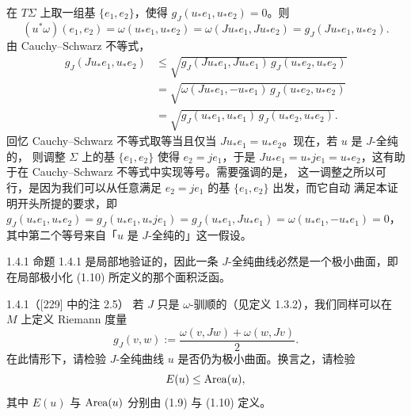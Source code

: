 \begin{wproof}
在 $T\Sigma$ 上取一组基 $\{e_1,e_2\}$，使得 $g_J(u_*e_1,u_*e_2)=0$。则
\[
  (u^*\omega)(e_1,e_2)=\omega(u_*e_1,u_*e_2)=\omega(Ju_*e_1,Ju_*e_2)=g_J(Ju_*e_1,u_*e_2).
\]
由 Cauchy--Schwarz 不等式，
\[
  \begin{aligned}
    g_J(Ju_*e_1,u_*e_2)
    &\le\sqrt{g_J(Ju_*e_1,Ju_*e_1)\,g_J(u_*e_2,u_*e_2)}\\
    &=\sqrt{\omega(Ju_*e_1,-u_*e_1)\,g_J(u_*e_2,u_*e_2)}\\
    &=\sqrt{g_J(u_*e_1,u_*e_1)\,g_J(u_*e_2,u_*e_2)} .
  \end{aligned}
\]
回忆 Cauchy--Schwarz 不等式取等当且仅当 $Ju_*e_1=u_*e_2$。现在，若 $u$ 是 $J$-全纯的，
则调整 $\Sigma$ 上的基 $\{e_1,e_2\}$ 使得 $e_2=je_1$，于是
$Ju_*e_1=u_*je_1=u_*e_2$，这有助于在 Cauchy--Schwarz 不等式中实现等号。需要强调的是，
这一调整之所以可行，是因为我们可以从任意满足 $e_2=je_1$ 的基 $\{e_1,e_2\}$ 出发，而它自动
满足本证明开头所提的要求，即
$g_J(u_*e_1,u_*e_2)=g_J(u_*e_1,u_*je_1)=g_J(u_*e_1,Ju_*e_1)=\omega(u_*e_1,-u_*e_1)=0$，
其中第二个等号来自「$u$ 是 $J$-全纯的」这一假设。
\end{wproof}

\begin{wrem}{1.4.1}
命题 1.4.1 是局部地验证的，因此一条 $J$-全纯曲线必然是一个极小曲面，即在局部极小化
(1.10) 所定义的那个面积泛函。
\end{wrem}

\begin{wexer}{1.4.1}（[229] 中的注 2.5）
若 $J$ 只是 $\omega$-驯顺的（见定义 1.3.2），我们同样可以在 $M$ 上定义 Riemann 度量
\[
  g_J(v,w):=\frac{\omega(v,Jw)+\omega(w,Jv)}{2}.
\]
在此情形下，请检验 $J$-全纯曲线 $u$ 是否仍为极小曲面。换言之，请检验
\[
  E(u)\le\operatorname{Area}(u),
\]
其中 $E(u)$ 与 $\operatorname{Area}(u)$ 分别由 (1.9) 与 (1.10) 定义。
\end{wexer}
